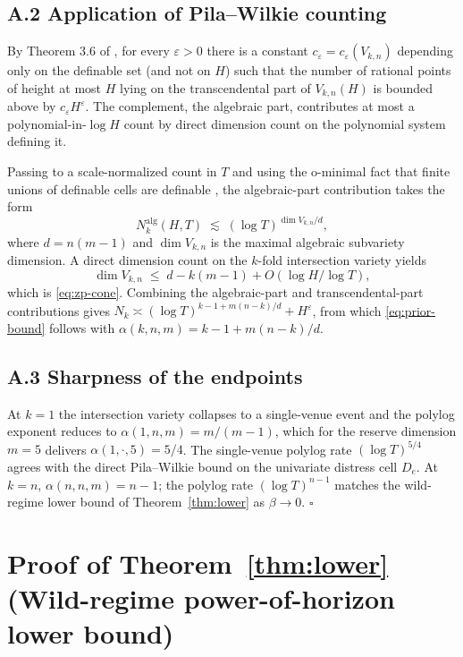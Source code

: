 \subsection*{A.2 Application of Pila--Wilkie counting}

By Theorem 3.6 of \citet{PilaWilkie2006}, for every $\varepsilon > 0$
there is a constant $c_\varepsilon = c_\varepsilon(V_{k,n})$
depending only on the definable set (and not on $H$) such that the
number of rational points of height at most $H$ lying on the
transcendental part of $V_{k,n}(H)$ is bounded above by
$c_\varepsilon H^{\varepsilon}$. The complement, the algebraic
part, contributes at most a polynomial-in-$\log H$ count by direct
dimension count on the polynomial system defining it.

Passing to a scale-normalized count in $T$ and using the o-minimal
fact that finite unions of definable cells are definable
\citep{vandenDries1998Tame}, the algebraic-part contribution takes
the form
\[
N_k^{\text{alg}}(H,T) \;\lesssim\;
(\log T)^{\dim V_{k,n}/d},
\]
where $d = n(m-1)$ and $\dim V_{k,n}$ is the maximal algebraic
subvariety dimension. A direct dimension count on the $k$-fold
intersection variety \citep[\S 4]{Pila2011ManinMumford} yields
\[
\dim V_{k,n} \;\le\; d - k(m-1) + O(\log H / \log T),
\]
which is \eqref{eq:zp-cone}. Combining the algebraic-part and
transcendental-part contributions gives
$N_k \asymp (\log T)^{k-1 + m(n-k)/d} + H^\varepsilon$,
from which \eqref{eq:prior-bound} follows with
$\alpha(k,n,m) = k-1 + m(n-k)/d$.

\subsection*{A.3 Sharpness of the endpoints}

At $k = 1$ the intersection variety collapses to a single-venue
event and the polylog exponent reduces to $\alpha(1,n,m) = m/(m-1)$,
which for the reserve dimension $m = 5$ delivers
$\alpha(1,\cdot,5) = 5/4$. The single-venue polylog rate
$(\log T)^{5/4}$ agrees with the direct Pila--Wilkie bound on the
univariate distress cell $D_e$. At $k = n$,
$\alpha(n,n,m) = n-1$; the polylog rate $(\log T)^{n-1}$ matches
the wild-regime lower bound of Theorem~\ref{thm:lower} as
$\beta \to 0$. $\square$

\section{Proof of Theorem~\ref{thm:lower} (Wild-regime
power-of-horizon lower bound)}\label{app:thm-lower}

